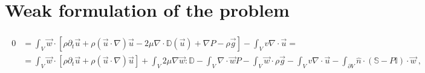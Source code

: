 \documentclass[letterpaper,10pt,english]{jupyterBook}
\begin{document}
\section{Weak formulation of the problem}
\label{\detokenize{ch/pde/ns:weak-formulation-of-the-problem}}

\begin{equation*}
\begin{split}\begin{aligned}
  0
  & = \int_{V} \vec{w} \cdot \left[ \rho \partial_t \vec{u} + \rho ( \vec{u} \cdot \nabla ) \vec{u} - 2 \mu \nabla \cdot \mathbb{D}(\vec{u}) + \nabla P - \rho \vec{g} \right] - \int_{V} v \nabla \cdot \vec{u} = \\
  & = \int_{V} \vec{w} \cdot \left[ \rho \partial_t \vec{u} + \rho ( \vec{u} \cdot \nabla ) \vec{u} \right] + \int_V 2 \mu \nabla \vec{w} : \mathbb{D} - \int_V \nabla \cdot \vec{w} P - \int_V \vec{w} \cdot \rho \vec{g} - \int_{V} v \nabla \cdot \vec{u} - \int_{\partial V} \hat{n} \cdot \left( \mathbb{S} - P \mathbb{I} \right) \cdot \vec{w} \ ,
\end{aligned}\end{split}
\end{equation*}
\end{document}
